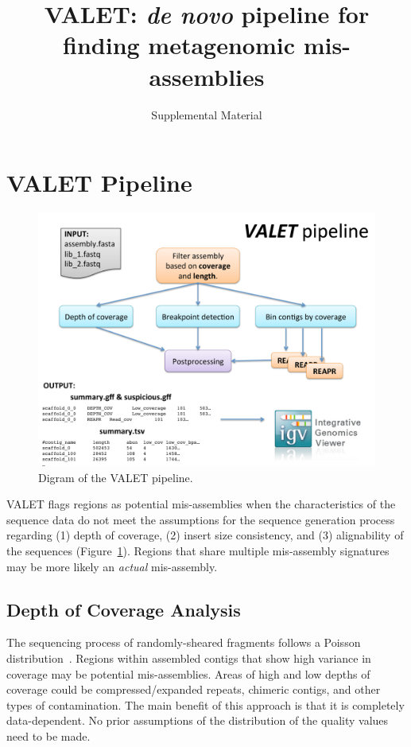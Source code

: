 \documentclass{article}
\begin{document}

\title{VALET: \emph{de novo} pipeline for finding metagenomic mis-assemblies}
\author{Supplemental Material}
\date{}
\maketitle
\section{VALET Pipeline}

\begin{figure}
\begin{center}
\includegraphics[width=\textwidth]{figures/valet_pipeline}
\end{center}
\caption[valet_pipeline]{Digram of the VALET pipeline.}
\label{fig:valet_pipeline}
\end{figure}

VALET flags regions as potential mis-assemblies when the characteristics of the sequence data do not meet the assumptions for the sequence generation process regarding (1) depth of coverage, (2) insert size consistency, and (3) alignability of the sequences (Figure~\ref{fig:valet_pipeline}). 
Regions that share multiple mis-assembly signatures may be more likely an \textit{actual} mis-assembly.



\subsection{Depth of Coverage Analysis}
The sequencing process of randomly-sheared fragments follows a Poisson distribution~\citep{lander1988genomic}.  Regions within assembled contigs that show high variance in coverage may be potential mis-assemblies. 
Areas of high and low depths of coverage could be compressed/expanded repeats, chimeric contigs, and other types of contamination. 
The main benefit of this approach is that it is completely data-dependent. No prior assumptions of the distribution of the quality values need to be made.
\end{document}
